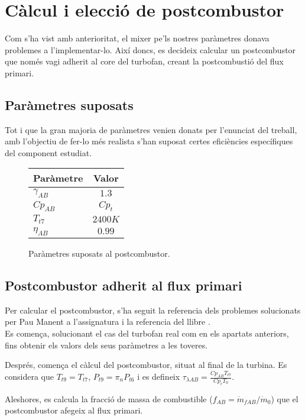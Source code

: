 \section{Càlcul i elecció de postcombustor}
Com s'ha vist amb anterioritat, el mixer pe'ls nostres paràmetres donava problemes a l'implementar-lo. Així doncs, es decideix calcular un postcombustor que només vagi adherit al core del turbofan, creant la postcombustió del flux primari.

\subsection{Paràmetres suposats }
Tot i que la gran majoria de paràmetres venien donats per l'enunciat del treball, amb l'objectiu de fer-lo més realista s'han suposat certes eficiències específiques del component estudiat.

\begin{figure}[H]
	\centering
	\begin{tabular}{lc}
		\toprule[3pt]
		\textbf{Paràmetre}&\textbf{Valor}\\
		\midrule[1pt]
		$\gamma_{AB}$ & $1.3$\\
		$ Cp_{AB}$ & $Cp_t$\\
		$T_{t7}$ & $2400K$\\
		$\eta_{AB}$ & $0.99$\\
		
		\bottomrule[2pt]
	\end{tabular}
	\label{ABparam}
	\caption{Paràmetres suposats al postcombustor.}
\end{figure}


\subsection{Postcombustor adherit al flux primari}
Per calcular el postcombustor, s'ha seguit la referencia dels problemes solucionats per Pau Manent a l'assignatura i la referencia del llibre \cite{mattingly}.\\

\noindent Es comença, solucionant el cas del turbofan real com en els apartats anteriors, fins obtenir els valors dels seus paràmetres a les toveres.

\noindent Després, comença el càlcul del postcombustor, situat al final de la turbina. Es considera que $T_{t9} = T_{t7}$, $P_{t9}=\pi_nP_{t6}$ i es defineix $\tau_{\lambda AB} = \frac{Cp_{AB}T_{t7}}{Cp_cT_0}$.

\noindent Aleshores, es calcula la fracció de massa de combustible ($f_{AB}=\dot{m}_{fAB}/\dot{m}_0$) que el postcombustor afegeix al flux primari.

